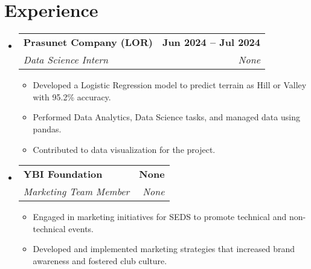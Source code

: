 \documentclass[letterpaper,11pt]{article}
\makeatletter
\newcommand{\resumeItem}[1]{
  \item\small{
    {#1 \vspace{-2pt}}
  }
}
\newcommand{\resumeSubheading}[4]{
  \vspace{-2pt}\item
    \begin{tabular*}{1.0\textwidth}[t]{l@{\extracolsep{\fill}}r}
      \textbf{#1} & \textbf{\small #2} \\
      \textit{\small#3} & \textit{\small #4} \\
    \end{tabular*}\vspace{-7pt}
}
\newcommand{\resumeSubHeadingListStart}{\begin{itemize}[leftmargin=0.0in, label={}]}
\newcommand{\resumeSubHeadingListEnd}{\end{itemize}}
\newcommand{\resumeItemListStart}{\begin{itemize}}
\newcommand{\resumeItemListEnd}{\end{itemize}\vspace{-5pt}}
\makeatother
\begin{document}
\section{Experience}
  \resumeSubHeadingListStart

    \resumeSubheading
      {Prasunet Company (LOR)}{Jun 2024 -- Jul 2024}
      {Data Science Intern}{None}
      \resumeItemListStart
        \resumeItem{Developed a Logistic Regression model to predict terrain as Hill or Valley with 95.2\% accuracy.}
        \resumeItem{Performed Data Analytics, Data Science tasks, and managed data using pandas.}
        \resumeItem{Contributed to data visualization for the project.}
      \resumeItemListEnd

    \resumeSubheading
      {YBI Foundation}{None}
      {Marketing Team Member}{None}
      \resumeItemListStart
        \resumeItem{Engaged in marketing initiatives for SEDS to promote technical and non-technical events.}
        \resumeItem{Developed and implemented marketing strategies that increased brand awareness and fostered club culture.}
      \resumeItemListEnd

  \resumeSubHeadingListEnd
\vspace{-16pt}



\end{document}
